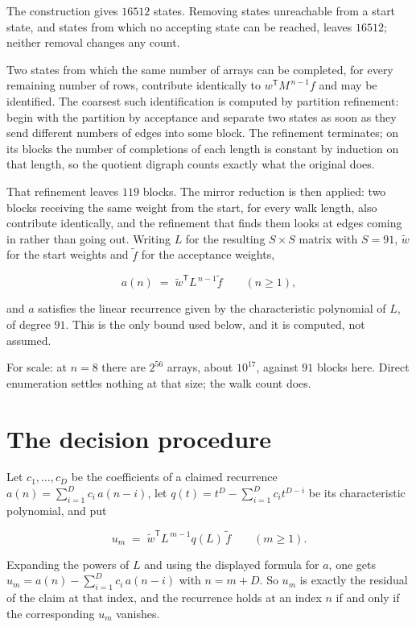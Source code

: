 \documentclass[11pt]{article}
\theoremstyle{definition}
\begin{document}
The construction gives $16512$ states. Removing states unreachable from a start state, and states from which no accepting state can be reached, leaves $16512$; neither removal changes any count.

Two states from which the same number of arrays can be completed, for every remaining number of rows, contribute identically to $w^{\mathsf T}M^{\,n-1}f$ and may be identified. The coarsest such identification is computed by partition refinement: begin with the partition by acceptance and separate two states as soon as they send different numbers of edges into some block. The refinement terminates; on its blocks the number of completions of each length is constant by induction on that length, so the quotient digraph counts exactly what the original does.

That refinement leaves $119$ blocks. The mirror reduction is then applied: two blocks receiving the same weight from the start, for every walk length, also contribute identically, and the refinement that finds them looks at edges coming in rather than going out. Writing $L$ for the resulting $S \times S$ matrix with $S = 91$, $\tilde w$ for the start weights and $\tilde f$ for the acceptance weights,

\[a(n) \;=\; \tilde w^{\mathsf T} L^{\,n-1} \tilde f \qquad (n \ge 1),\]

and $a$ satisfies the linear recurrence given by the characteristic polynomial of $L$, of degree $91$. This is the only bound used below, and it is computed, not assumed.

For scale: at $n = 8$ there are $2^{56}$ arrays, about $10^{17}$, against $91$ blocks here. Direct enumeration settles nothing at that size; the walk count does.

\section{The decision procedure}

Let $c_1,\dots,c_D$ be the coefficients of a claimed recurrence $a(n) = \sum_{i=1}^{D} c_i\,a(n-i)$, let $q(t) = t^{D} - \sum_{i=1}^{D} c_i t^{D-i}$ be its characteristic polynomial, and put

\[u_m \;=\; \tilde w^{\mathsf T} L^{\,m-1} q(L)\,\tilde f \qquad (m \ge 1).\]

Expanding the powers of $L$ and using the displayed formula for $a$, one gets $u_m = a(n) - \sum_{i=1}^{D} c_i\,a(n-i)$ with $n = m + D$. So $u_m$ is exactly the residual of the claim at that index, and the recurrence holds at an index $n$ if and only if the corresponding $u_m$ vanishes.
\end{document}
